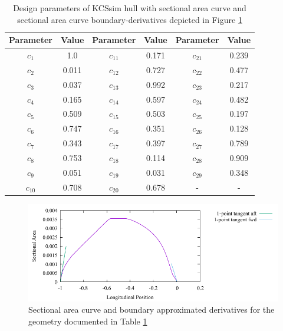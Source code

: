\documentclass{report}
\begin{document}
\begin{table}[H]
    \centering
    \begin{tabular}{|c|c|c|c|c|c|}
        \hline 
        Parameter & Value & Parameter & Value & Parameter & Value\\
        \hline 
        $c_1$ & 1.0 & $c_{11}$ & 0.171 & $c_{21}$ & 0.239 \\
        \hline 
        $c_2$ & 0.011 & $c_{12}$ & 0.727 & $c_{22}$ & 0.477\\
        \hline 
        $c_3$ & 0.037 & $c_{13}$ & 0.992 & $c_{23}$ & 0.217 \\
        \hline 
        $c_4$ & 0.165 & $c_{14}$ & 0.597 & $c_{24}$ & 0.482 \\
        \hline 
        $c_5$ & 0.509 & $c_{15}$ & 0.503 & $c_{25}$ & 0.197 \\
        \hline 
        $c_6$ & 0.747 & $c_{16}$ & 0.351 & $c_{26}$ & 0.128 \\
        \hline 
        $c_7$ & 0.343 & $c_{17}$ & 0.397 & $c_{27}$ & 0.789 \\
        \hline 
        $c_8$ & 0.753 & $c_{18}$ & 0.114 & $c_{28}$ & 0.909 \\
        \hline 
        $c_9$ & 0.051 & $c_{19}$ & 0.031 & $c_{29}$ & 0.348 \\
        \hline 
        $c_{10}$ & 0.708 & $c_{20}$ & 0.678 & - & - \\
        \hline 
    \end{tabular}
    \caption{Design parameters of KCSsim hull with sectional area curve and 
    sectional area curve boundary-derivatives depicted in Figure
    \ref{fig:test-4-sac-11}}
    \label{tab:test-4-11}
\end{table}
\begin{figure}[H]
    \centering
    \includegraphics[width = 0.7\linewidth]{figures/test-4-sac-11.pdf}
    \caption{Sectional area curve and boundary approximated derivatives for
    the geometry documented in Table \ref{tab:test-4-11}}
    \label{fig:test-4-sac-11}
\end{figure}
\end{document}
